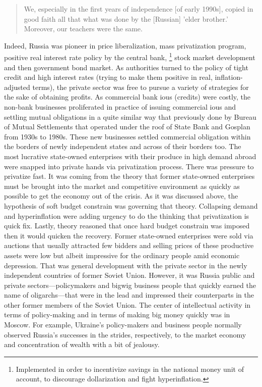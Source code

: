 \begin{quote}
 We, especially in the first years of independence [of early 1990s],
 copied in good faith all that what was done by the [Russian] 'elder
 brother.' Moreover, our teachers were the same.~\citep[p.~232]{galchynskiy}
\end{quote}

Indeed, Russia was pioneer in price liberalization, mass privatization
program, positive real interest rate policy by the central bank,
\footnote{Implemented in order to incentivize savings in the national money
    unit of account, to discourage dollarization and fight
    hyperinflation.} stock market development and then government bond market. As authorities
turned to the policy of tight credit and high interest rates (trying to
make them positive in real, inflation-adjusted terms), the private
sector was free to pursue a variety of strategies for the sake of
obtaining profits. As commercial bank \acp{iou} (credits) were costly, the
non-bank businesses proliferated in practice of issuing commercial \acp{iou}
and settling mutual obligations in a quite similar way that previously
done by Bureau of Mutual Settlements that operated under the roof of
State Bank and Gosplan from 1930s to 1980s. These new businesses settled
commercial obligation within the borders of newly independent states and
across of their borders too. The most lucrative state-owned enterprises
with their produce in high demand abroad were snapped into private hands
via privatization process. There was pressure to privatize fast. It was
coming from the theory that former state-owned enterprises must be
brought into the market and competitive environment as quickly as
possible to get the economy out of the crisis. As it was discussed
above, the hypothesis of soft budget constrain was governing that
theory. Collapsing demand and hyperinflation were adding urgency to do
the thinking that privatization is quick fix. Lastly, theory reasoned
that once hard budget constrain was imposed then it would quicken the
recovery. Former state-owned enterprises were sold via auctions that
usually attracted few bidders and selling prices of these productive
assets were low but albeit impressive for the ordinary people amid
economic depression. That was general development with the private
sector in the newly independent countries of former Soviet Union.
However, it was Russia public and private sectors---policymakers and
bigwig business people that quickly earned the name of oligarchs---that
were in the lead and impressed their counterparts in the other former
members of the Soviet Union. The center of intellectual activity in
terms of policy-making and in terms of making big money quickly was in
Moscow. For example, Ukraine's policy-makers and business people
normally observed Russia's successes in the strides, respectively, to
the market economy and concentration of wealth with a bit of jealousy.

